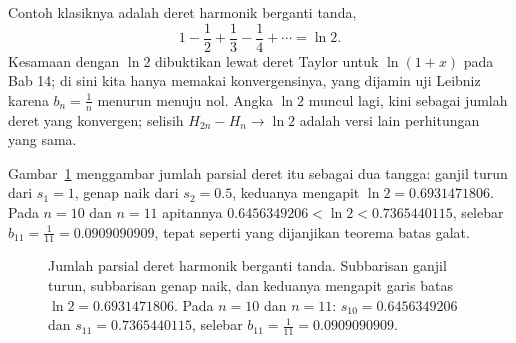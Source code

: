 Contoh klasiknya adalah deret harmonik berganti tanda,
\[
  1 - \frac{1}{2} + \frac{1}{3} - \frac{1}{4} + \cdots = \ln 2 .
\]
Kesamaan dengan $\ln 2$ dibuktikan lewat deret Taylor untuk $\ln(1+x)$ pada Bab 14;
di sini kita hanya memakai konvergensinya, yang dijamin uji Leibniz karena
$b_n = \frac{1}{n}$ menurun menuju nol. Angka $\ln 2$ muncul lagi, kini sebagai jumlah deret yang konvergen; selisih
$H_{2n} - H_n \to \ln 2$ adalah versi lain perhitungan yang sama.

Gambar~\ref{fig:tangga-leibniz} menggambar jumlah parsial deret itu sebagai dua tangga:
ganjil turun dari $s_1 = 1$, genap naik dari $s_2 = 0.5$, keduanya mengapit
$\ln 2 = 0.6931471806$. Pada $n = 10$ dan $n = 11$ apitannya
$0.6456349206 < \ln 2 < 0.7365440115$, selebar $b_{11} = \tfrac{1}{11} = 0.0909090909$,
tepat seperti yang dijanjikan teorema batas galat.

\begin{figure}[htbp]
\centering
{}
\caption{Jumlah parsial deret harmonik berganti tanda. Subbarisan ganjil turun,
subbarisan genap naik, dan keduanya mengapit garis batas $\ln 2 = 0.6931471806$.
Pada $n = 10$ dan $n = 11$: $s_{10} = 0.6456349206$ dan $s_{11} = 0.7365440115$,
selebar $b_{11} = \tfrac{1}{11} = 0.0909090909$.}
\label{fig:tangga-leibniz}
\end{figure}

